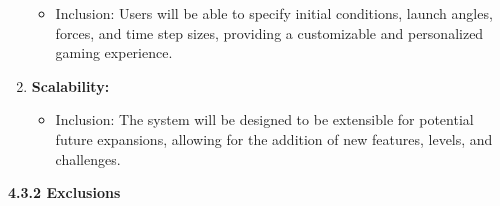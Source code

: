 \documentclass[
]{article}
\begin{document}
\begin{enumerate}
  \begin{itemize}
  \item
    Inclusion: Users will be able to specify initial conditions, launch
    angles, forces, and time step sizes, providing a customizable and
    personalized gaming experience.
  \end{itemize}
\item
  \textbf{Scalability:}

  \begin{itemize}
  \item
    Inclusion: The system will be designed to be extensible for
    potential future expansions, allowing for the addition of new
    features, levels, and challenges.
  \end{itemize}
\end{enumerate}

\textbf{4.3.2 Exclusions}
\end{document}
